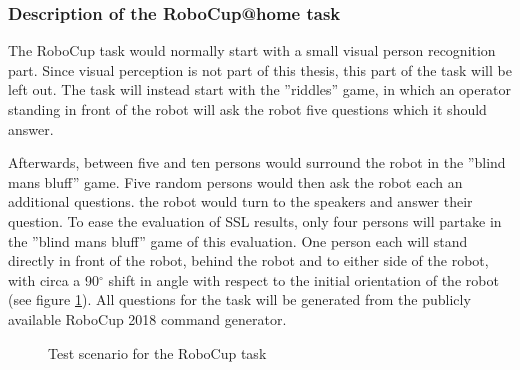\subsubsection{Description of the RoboCup@home task}
The RoboCup task would normally start with a small visual person recognition part.
Since visual perception is not part of this thesis, this part of the task will be left out.
The task will instead start with the ''riddles'' game, in which an operator standing in front of the robot will ask the robot five questions which it should answer.

Afterwards, between five and ten persons would surround the robot in the ''blind mans bluff'' game.
Five random persons would then ask the robot each an additional questions.
the robot would turn to the speakers and answer their question.
To ease the evaluation of SSL results, only four persons will partake in the ''blind mans bluff'' game of this evaluation.
One person each will stand directly in front of the robot, behind the robot and to either side of the robot, with circa a 90$^\circ$ shift in angle with respect to the initial orientation of the robot (see figure \ref{pic:eval_task}).
All questions for the task will be generated from the publicly available RoboCup 2018 command generator.



\begin{figure}[]
	\centering
	\caption{Test scenario for the RoboCup task}
	\label{pic:eval_task}
\end{figure}

